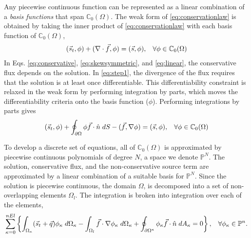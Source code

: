 \documentclass{softwaremanual}
\begin{document}
Any piecewise continuous function can be represented as a linear combination of a \textit{basis functions} that span $\mathbb{C}_0(\Omega)$. The weak form of \eqref{eq:conservationlaw} is obtained by taking the inner product of \eqref{eq:conservationlaw} with each basis function of $\mathbb{C}_0(\Omega)$,  
\begin{equation}
(\vec{s}_t,\phi) + (\nabla \cdot \vec{f}, \phi) = (\vec{s},\phi), \hspace{3mm} \forall \phi \in \mathbb{C}_0(\Omega) \label{eq:step1}
\end{equation}
In Eqs. \eqref{eq:conservative}, \eqref{eq:skewsymmetric}, and \eqref{eq:linear}, the conservative flux depends on the solution. In \eqref{eq:step1}, the divergence of the flux  requires that the solution is at least once differentiable. This differentiability constraint is relaxed in the weak form by performing integration by parts, which moves the differentiability criteria onto the basis function ($\phi$). Performing integrations by parts gives
\begin{equation}
(\vec{s}_t,\phi) + \oint_{\partial \Omega}\phi \vec{f} \cdot \hat{n} \hspace{1mm} dS - ( \vec{f},\nabla \phi) = (\vec{s},\phi), \hspace{3mm} \forall \phi \in \mathbb{C}_0(\Omega) \label{eq:weakform}
\end{equation}


 To develop a discrete set of equations, all of $\mathbb{C}_0(\Omega)$ is approximated by piecewise continuous polynomials of degree $N$, a space we denote $\mathbb{P}^N$. The solution, conservative flux, and the non-conservative source term are approximated by a linear combination of a suitable basis for $\mathbb{P}^N$. Since the solution is piecewise continuous, the domain $\Omega$, is decomposed into a set of non-overlapping elements $\Omega_l$. The integration is  broken into integration over each of the elements,
  \begin{equation}
 \sum_{\kappa=0}^{nEl} \left\lbrace \int_{\Omega_\kappa} (\vec{s}_t + \vec{q} )\phi_\kappa \hspace{1mm} d\Omega_\kappa  - \int_{\Omega_l} \vec{f} \cdot \nabla \phi_\kappa \hspace{1mm} d\Omega_\kappa + \oint_{\partial \Omega^\kappa} \phi_\kappa \vec{f}\cdot \hat{n} \hspace{1mm} d A_\kappa = 0 \right\rbrace, \hspace{3mm} \forall \phi_\kappa \in \mathbb{P}^n. \label{eq:weak-decomp}
  \end{equation}
\end{document}
